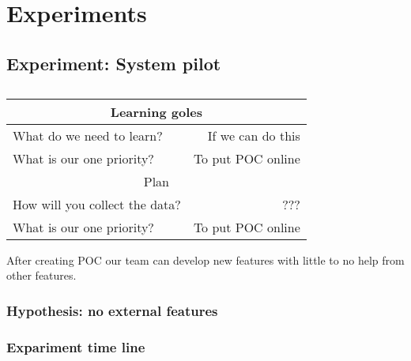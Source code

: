 \section{Experiments}
\subsection{Experiment: System pilot}\label{EXP:1}

\begin{table}[h!]
    \begin{center}
      \label{tab:table1}
      \begin{tabular}{|l|r|} 
        \hline
        \multicolumn{2}{|c|}{Learning goles} \\\hline
        What do we need to learn? & If we can do this \\\hline
        What is our one priority? & To put POC online \\\hline
        \multicolumn{2}{|c|}{Plan} \\\hline
        How will you collect the data? & ??? \\\hline
        What is our one priority? & To put POC online \\\hline
      \end{tabular}
      \caption{}
    \end{center}
  \end{table}






After creating POC our team can develop new features with little to no help from other features.

\subsubsection{Hypothesis: no external features}
\secstarter
{}
\secend

\subsubsection{Expariment time line}


